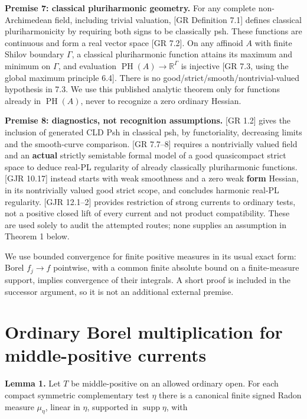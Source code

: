 \documentclass[
  11pt,
]{article}
\begin{document}
\textbf{Premise 7: classical pluriharmonic geometry.} For any complete
non-Archimedean field, including trivial valuation, {[}GR Definition
7.1{]} defines classical pluriharmonicity by requiring both signs to be
classically psh. These functions are continuous and form a real vector
space {[}GR 7.2{]}. On any affinoid \(A\) with finite Shilov boundary
\(\Gamma\), a classical pluriharmonic function attains its maximum and
minimum on \(\Gamma\), and evaluation
\(\operatorname{PH}(A)\to\mathbb R^\Gamma\) is injective {[}GR 7.3,
using the global maximum principle 6.4{]}. There is no
good/strict/smooth/nontrivial-valued hypothesis in 7.3. We use this
published analytic theorem only for functions already in
\(\operatorname{PH}(A)\), never to recognize a zero ordinary Hessian.

\textbf{Premise 8: diagnostics, not recognition assumptions.} {[}GR
1.2{]} gives the inclusion of generated CLD Psh in classical psh, by
functoriality, decreasing limits and the smooth-curve comparison. {[}GR
7.7--8{]} requires a nontrivially valued field and an \textbf{actual}
strictly semistable formal model of a good quasicompact strict space to
deduce real-PL regularity of already classically pluriharmonic
functions. {[}GJR 10.17{]} instead starts with weak smoothness and a
zero weak \textbf{form} Hessian, in its nontrivially valued good strict
scope, and concludes harmonic real-PL regularity. {[}GJR 12.1--2{]}
provides restriction of strong currents to ordinary tests, not a
positive closed lift of every current and not product compatibility.
These are used solely to audit the attempted routes; none supplies an
assumption in Theorem 1 below.

We use bounded convergence for finite positive measures in its usual
exact form: Borel \(f_j\to f\) pointwise, with a common finite absolute
bound on a finite-measure support, implies convergence of their
integrals. A short proof is included in the successor argument, so it is
not an additional external premise.

\section{Ordinary Borel multiplication for middle-positive
currents}\label{ordinary-borel-multiplication-for-middle-positive-currents}

\textbf{Lemma 1.} Let \(T\) be middle-positive on an allowed ordinary
open. For each compact symmetric complementary test \(\eta\) there is a
canonical finite signed Radon measure \(\mu_\eta\), linear in \(\eta\),
supported in \(\operatorname{supp}\eta\), with
\end{document}
